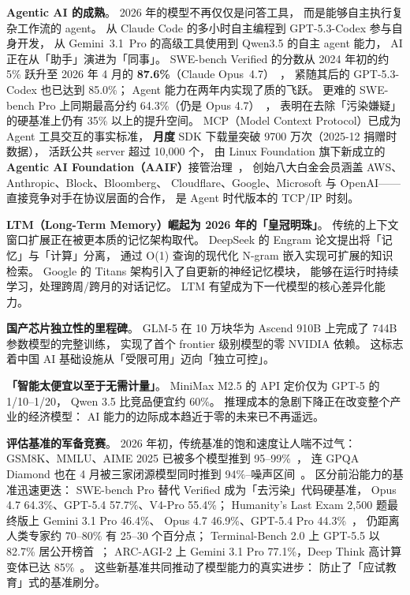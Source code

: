 \textbf{Agentic AI 的成熟}。
2026 年的模型不再仅仅是问答工具，
而是能够自主执行复杂工作流的 agent。
从 Claude Code 的多小时自主编程到 GPT-5.3-Codex 参与自身开发，
从 Gemini~3.1~Pro 的高级工具使用到 Qwen3.5 的自主 agent 能力，
AI 正在从「助手」演进为「同事」。
SWE-bench Verified 的分数从 2024 年初的约 5\%
跃升至 2026 年 4 月的 \textbf{87.6\%}（Claude Opus~4.7）~\cite{tokenmix2026swebench}，
紧随其后的 GPT-5.3-Codex 也已达到 85.0\%；
Agent 能力在两年内实现了质的飞跃。
更难的 SWE-bench Pro 上同期最高分约 64.3\%（仍是 Opus 4.7）~\cite{buildfast2026opus47}，
表明在去除「污染嫌疑」的硬基准上仍有 35\% 以上的提升空间。
MCP（Model Context Protocol）已成为 Agent 工具交互的事实标准，
\textbf{月度} SDK 下载量突破 9700 万次（2025-12 捐赠时数据），
活跃公共 server 超过 10,000 个，
由 Linux Foundation 旗下新成立的
\textbf{Agentic AI Foundation（AAIF）}接管治理~\cite{aaif2026foundation}，
创始八大白金会员涵盖 AWS、Anthropic、Block、Bloomberg、
Cloudflare、Google、Microsoft 与 OpenAI——
直接竞争对手在协议层面的合作，
是 Agent 时代版本的 TCP/IP 时刻。

\textbf{LTM（Long-Term Memory）崛起为 2026 年的「皇冠明珠」}。
传统的上下文窗口扩展正在被更本质的记忆架构取代。
DeepSeek 的 Engram 论文提出将「记忆」与「计算」分离，
通过 O(1) 查询的现代化 N-gram 嵌入实现可扩展的知识检索。
Google 的 Titans 架构引入了自更新的神经记忆模块，
能够在运行时持续学习，处理跨周/跨月的对话记忆。
LTM 有望成为下一代模型的核心差异化能力。

\textbf{国产芯片独立性的里程碑}。
GLM-5 在 10 万块华为 Ascend 910B 上完成了 744B 参数模型的完整训练，
实现了首个 frontier 级别模型的零 NVIDIA 依赖。
这标志着中国 AI 基础设施从「受限可用」迈向「独立可控」。

\textbf{「智能太便宜以至于无需计量」}。
MiniMax M2.5 的 API 定价仅为 GPT-5 的 1/10--1/20，
Qwen 3.5 比竞品便宜约 60\%。
推理成本的急剧下降正在改变整个产业的经济模型：
AI 能力的边际成本趋近于零的未来已不再遥远。

\textbf{评估基准的军备竞赛}。
2026 年初，传统基准的饱和速度让人喘不过气：
GSM8K、MMLU、AIME 2025 已被多个模型推到 95--99\%~\cite{ppt2026aime25}，
连 GPQA Diamond 也在 4 月被三家闭源模型同时推到 94\%--噪声区间~\cite{buildfast2026opus47}。
区分前沿能力的基准迅速更迭：
SWE-bench Pro 替代 Verified 成为「去污染」代码硬基准，
Opus 4.7 64.3\%、GPT-5.4 57.7\%、V4-Pro 55.4\%；
Humanity's Last Exam 2,500 题最终版上 Gemini 3.1 Pro 46.4\%、
Opus 4.7 46.9\%、GPT-5.4 Pro 44.3\%~\cite{ppt2026hle}，
仍距离人类专家约 70--80\% 有 25--30 个百分点；
Terminal-Bench 2.0 上 GPT-5.5 以 82.7\% 居公开榜首~\cite{benchlm2026terminal2}；
ARC-AGI-2 上 Gemini 3.1 Pro 77.1\%，Deep Think 高计算变体已达 85\%~\cite{benchlm2026arcagi2}。
这些新基准共同推动了模型能力的真实进步：
防止了「应试教育」式的基准刷分。

